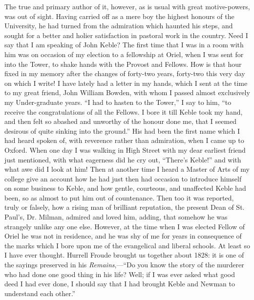 The true and primary author of it, however, as is usual with great
motive-powers, was out of sight. Having carried off as a mere boy the
highest honours of the University, he had turned from the admiration
which haunted his steps, and sought for a better and holier
satisfaction in pastoral work in the country. Need I say that I am
speaking of John Keble? The first time that I was in a room with him
was on occasion of my election to a fellowship at Oriel, when I was
sent for into the Tower, to shake hands with the Provost and Fellows.
How is that hour fixed in my memory after the changes of forty-two
years, forty-two this very day on which I write! I have lately had a
letter in my hands, which I sent at the time to my great friend, John William Bowden, with whom I passed almost exclusively my
Under-graduate years. ``I had to hasten to the Tower,'' I say
to him, ``to receive the congratulations of all the Fellows. I
bore it till Keble took my hand, and then felt so abashed and unworthy
of the honour done me, that I seemed desirous of quite sinking into
the ground.'' His had been the first name which I had heard spoken
of, with reverence rather than admiration, when I came up to Oxford.
When one day I was walking in High Street with my dear earliest friend
just mentioned, with what eagerness did he cry out, ``There's
Keble!'' and with what awe did I look at him! Then at another time
I heard a Master of Arts of my college give an account how he had just
then had occasion to introduce himself on some business to Keble, and
how gentle, courteous, and unaffected Keble had been, so as almost to
put him out of countenance. Then too it was reported, truly or
falsely, how a rising man of brilliant reputation, the present Dean of
St. Paul's, Dr. Milman, admired and loved him, adding, that
somehow he was strangely unlike any one else. However, at the
time when I was elected Fellow of Oriel he was not in residence, and
he was shy of me for years in consequence of the marks which I bore
upon me of the evangelical and liberal schools. At least so I have
ever thought. Hurrell Froude brought us together about 1828: it is one
of the sayings preserved in his \emph{Remains},—``Do you
know the story of the murderer who had done one good thing in his
life? Well; if I was ever asked what good deed I had ever done, I
should say that I had brought Keble and Newman to understand each
other.''

